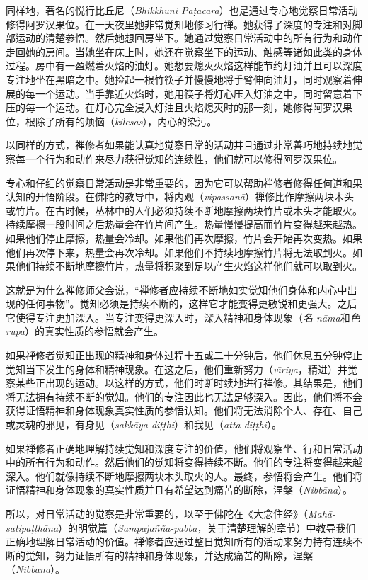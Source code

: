 同样地，著名的悦行比丘尼（{\it Bhikkhuni Pa\d t\=ac\=ar\=a}）也是通过专心地觉察日常活动修得阿罗汉果位。在一天夜里她非常觉知地修习行禅。她获得了深度的专注和对脚部运动的清楚参悟。然后她想回房坐下。她通过觉察日常活动中的所有行为和动作走回她的房间。当她坐在床上时，她还在觉察坐下的运动、触感等诸如此类的身体过程。房中有一盈燃着火焰的油灯。她想要熄灭火焰这样能节约灯油并且可以深度专注地坐在黑暗之中。她捡起一根竹筷子并慢慢地将手臂伸向油灯，同时观察着伸展的每一个运动。当手靠近火焰时，她用筷子将灯心压入灯油之中，同时留意着下压的每一个运动。在灯心完全浸入灯油且火焰熄灭时的那一刻，她修得阿罗汉果位，根除了所有的烦恼（{\it kilesas}），内心的染污。

以同样的方式，禅修者如果能认真地觉察日常的活动并且通过非常善巧地持续地觉察每一个行为和动作来尽力获得觉知的连续性，他们就可以修得阿罗汉果位。

专心和仔细的觉察日常活动是非常重要的，因为它可以帮助禅修者修得任何道和果\1认知的开悟阶段。在佛陀的教导中，将内观（{\it vipassan\=a}）禅修比作摩擦两块木头或竹片。在古时候，丛林中的人们必须持续不断地摩擦两块竹片或木头才能取火。持续摩擦一段时间之后热量会在竹片间产生。热量慢慢提高而竹片变得越来越热。如果他们停止摩擦，热量会冷却。如果他们再次摩擦，竹片会开始再次变热。如果他们再次停下来，热量会再次冷却。如果他们不持续地摩擦竹片将无法取到火。如果他们持续不断地摩擦竹片，热量将积聚到足以产生火焰这样他们就可以取到火。

这就是为什么禅修师父会说，“禅修者应持续不断地如实觉知他们身体和内心中出现的任何事物”。觉知必须是持续不断的，这样它才能变得更敏锐和更强大。之后它使得专注更加深入。当专注变得更深入时，深入精神和身体现象（{\it 名 n\=ama}和{\it 色 r\=upa}）的真实性质的参悟就会产生。

如果禅修者觉知正出现的精神和身体过程十五或二十分钟后，他们休息五分钟停止觉知当下发生的身体和精神现象。在这之后，他们重新努力（{\it v\=\i riya}，精进）并觉察某些正出现的运动。以这样的方式，他们时断时续地进行禅修。其结果是，他们将无法拥有持续不断的觉知。他们的专注因此\1也无法足够深入。因此，他们将不会获得证悟精神和身体现象真实性质的参悟认知。他们将无法消除个人、存在、自己或灵魂的邪见，有身见（{\it sakk\=aya-di\d t\d thi}）和我见（{\it atta-di\d t\d thi}）。

如果禅修者正确地理解持续觉知和深度专注的价值，他们将观察坐、行和日常活动中的所有行为和动作。然后他们的觉知将变得持续不断。他们的专注将变得越来越深入。他们就像持续不断地摩擦两块木头取火的人。最终，参悟将会产生。他们将证悟精神和身体现象的真实性质并且有希望达到痛苦的断除，涅槃（{\it Nibb\=ana}）。

所以，对日常活动的觉察是非常重要的，以至于佛陀在《大念住经》（{\it Mah\=a-satipa\d t\d th\=ana}）的明觉篇（{\it Sampaja\~n\~na-pabba}，关于清楚理解的章节）中教导我们正确地理解日常活动的价值。禅修者应通过整日觉知所有的活动来努力持有连续不断的觉知，努力证悟所有的精神和身体现象，并达成痛苦的断除，涅槃（{\it Nibb\=ana}）。

